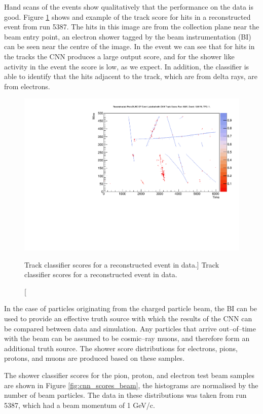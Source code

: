 Hand scans of the events show qualitatively that the performance on the data is
good. Figure \ref{fig:real_event} shows and example of the track score for hits
in a reconstructed event from run 5387. The hits in this image are from the
collection plane near the beam entry point, an electron shower tagged by the
beam instrumentation (BI) can be seen near the centre of the image. In the event
we can see that for hits in the tracks the CNN produces a large output score,
and for the shower like activity in the event the score is low, as we expect. In
addition, the classifier is able to identify that the hits adjacent to the 
track, which are from delta rays, are from electrons.

\begin{figure}
	\centering
	\includegraphics[width=\textwidth]{figures/run5387_tpc1_view2_128178.pdf}
	\caption
	[Track classifier scores for a reconstructed event in \protodune{} data.]
	{Track classifier scores for a reconstructed event in \protodune{} data.}
	\label{fig:real_event}
\end{figure}

In the case of particles originating from the charged particle beam, the BI can
be used to provide an effective truth source with which the results of the CNN 
can be compared between data and simulation. Any particles that arrive
out--of--time with the beam can be assumed to be cosmic--ray muons, and 
therefore form an additional truth source. The shower score distributions for
electrons, pions, protons, and muons are produced based on these samples.

The shower classifier scores for the pion, proton, and electron test beam 
samples are shown in Figure \ref{fig:cnn_scores_beam}, the histograms are
normalised by the number of beam particles. The data in these distributions was
taken from \protodune{} run 5387, which had a beam momentum of 1 GeV/c.

